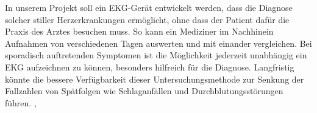In unserem Projekt soll ein EKG-Gerät entwickelt werden, dass die Diagnose solcher stiller Herzerkrankungen ermöglicht, ohne dass der Patient dafür die Praxis des Arztes besuchen muss. So kann ein Mediziner im Nachhinein Aufnahmen von verschiedenen Tagen auswerten und mit einander vergleichen. Bei sporadisch auftretenden Symptomen ist die Möglichkeit jederzeit unabhängig ein EKG aufzeichnen zu können, besonders hilfreich für die Diagnose. Langfristig könnte die bessere Verfügbarkeit dieser Untersuchungsmethode zur Senkung der Fallzahlen von Spätfolgen wie Schlaganfällen und Durchblutungsstörungen führen. \cite{Apothekenumschau}, \cite{Ärzteblatt}
